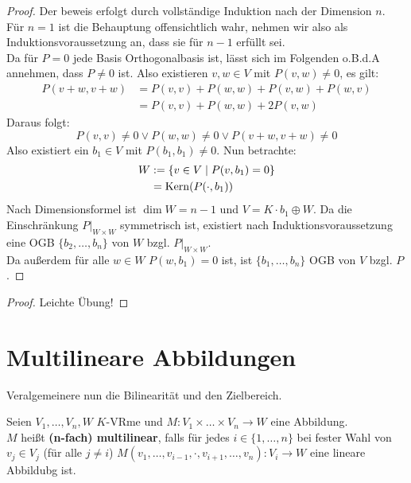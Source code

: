 \documentclass[parskip,a4paper,twoside,DIV15,BCOR12mm]{scrbook}
\begin{document}
\begin{proof}
Der beweis erfolgt durch vollständige Induktion nach der Dimension $n$.\\
Für $n=1$ ist die Behauptung offensichtlich wahr, nehmen wir also als Induktionsvoraussetzung an,
dass sie für $n-1$ erfüllt sei.\\
Da für $P=0$ jede Basis Orthogonalbasis ist, lässt sich im Folgenden o.B.d.A annehmen,
dass $P\ne 0$ ist. Also existieren $v,w\in V$ mit $P(v,w)\ne 0$, es gilt:
\begin{align*}
P(v+w,v+w)&=P(v,v)+P(w,w)+P(v,w)+P(w,v)\\
&= P(v,v)+P(w,w)+2P(v,w)
\end{align*}
Daraus folgt:
\[P(v,v)\ne 0 \vee P(w,w)\ne 0 \vee P(v+w,v+w)\ne 0\]
Also existiert ein $b_1\in V$ mit $P(b_1,b_1)\ne 0$. Nun betrachte:
\begin{align*}
W&:=\{v\in V\mid P(v,b_1)=0\}\\
&=\operatorname{Kern}(P(\cdot,b_1))
\end{align*}
Nach Dimensionsformel ist $\dim W=n-1$ und $V=K\cdot b_1 \oplus W$. Da die 
Einschränkung $P|_{W\times W}$ symmetrisch ist, existiert nach Induktionsvoraussetzung
eine OGB $\{b_2,\ldots,b_n\}$ von $W$ bzgl. $P|_{W\times W}$.\\
Da außerdem für alle $w\in W$ $P(w,b_1)=0$ ist, ist
$\{b_1,\ldots,b_n\}$ OGB von $V$ bzgl. $P$.
\end{proof}

\begin{comment}
\index{Fourierformel}
Die Basisdarstellung bzgl. eine ONB $B$ lautet:
\[v=\sum_{b\in B}P(v,b)\cdot b\]
\end{comment}

\begin{proof}
Leichte Übung!
\end{proof}

\section{Multilineare Abbildungen}
Veralgemeinere nun die Bilinearität und den Zielbereich.

\begin{definition}
Seien $V_1,\ldots,V_n,W$ $K$-VRme und $M:V_1\times\ldots\times V_n\to W$ eine Abbildung.\\
$M$ heißt \textbf{(n-fach) multilinear}, falls für jedes $i\in\{1,\ldots,n\}$ bei fester
Wahl von $v_j\in V_j$ (für alle $j\ne i$) $M(v_1,\ldots,v_{i-1},\cdot,v_{i+1},\ldots,v_n):V_i\to W$
eine lineare Abbildubg ist.
\end{definition}
\end{document}
